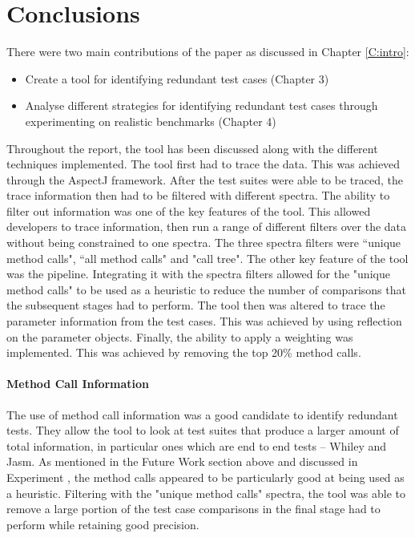 \section{Conclusions}

There were two main contributions of the paper as discussed in Chapter \ref{C:intro}:

\begin{itemize}
\item Create a tool for identifying redundant test cases (Chapter 3)
\item Analyse different strategies for identifying redundant test cases through experimenting on realistic benchmarks (Chapter 4)
\end{itemize}

Throughout the report, the tool has been discussed along with the different techniques implemented. The tool first had to trace the data. This was achieved through the AspectJ framework. After the test suites were able to be traced, the trace information then had to be filtered with different spectra. The ability to filter out information was one of the key features of the tool. This allowed developers to trace information, then run a range of different filters over the data without being constrained to one spectra. The three spectra filters were ``unique method calls", ``all method calls" and "call tree". The other key feature of the tool was the pipeline. Integrating it with the spectra filters allowed for the "unique method calls" to be used as a heuristic to reduce the number of comparisons that the subsequent stages had to perform. The tool then was altered to trace the parameter information from the test cases. This was achieved by using reflection on the parameter objects. Finally, the ability to apply a weighting was implemented. This was achieved by removing the top 20\% method calls.

\paragraph{Method Call Information}
The use of method call information was a good candidate to identify redundant tests. They allow the tool to look at test suites that produce a larger amount of total information, in particular ones which are end to end tests -- Whiley and Jasm. As mentioned in the Future Work section above and discussed in Experiment , the method calls appeared to be particularly good at being used as a heuristic. Filtering with the "unique method calls" spectra, the tool was able to remove a large portion of the test case comparisons in the final stage had to perform while retaining good precision.

